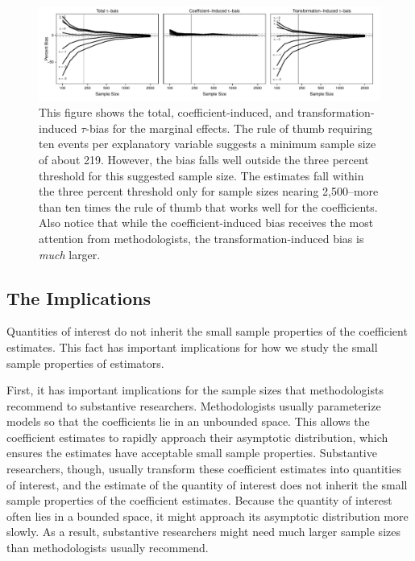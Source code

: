 \documentclass[12pt]{article}
\begin{document}
\begin{figure}[h!]
\begin{center}
\includegraphics[width = \textwidth]{figs/bias-me.pdf}
\caption{This figure shows the total, coefficient-induced, and transformation-induced $\tau$-bias for the marginal effects. The rule of thumb requiring ten events per explanatory variable suggests a minimum sample size of about 219. However, the bias falls well outside the three percent threshold for this suggested sample size. The estimates fall within the three percent threshold only for sample sizes nearing 2,500--more than ten times the rule of thumb that works well for the coefficients. Also notice that while the coefficient-induced bias receives the most attention from methodologists, the transformation-induced bias is \textit{much} larger.}\label{fig:logit-me-bias}
\end{center}
\end{figure}

\subsection*{The Implications}

Quantities of interest do not inherit the small sample properties of the coefficient estimates.
This fact has important implications for how we study the small sample properties of estimators. 

First, it has important implications for the sample sizes that methodologists recommend to substantive researchers. 
Methodologists usually parameterize models so that the coefficients lie in an unbounded space. 
This allows the coefficient estimates to rapidly approach their asymptotic distribution, which ensures the estimates have acceptable small sample properties. 
Substantive researchers, though, usually transform these coefficient estimates into quantities of interest, and the estimate of the quantity of interest does not inherit the small sample properties of the coefficient estimates. 
Because the quantity of interest often lies in a bounded space, it might approach its asymptotic distribution more slowly. 
As a result, substantive researchers might need much larger sample sizes than methodologists usually recommend.
\end{document}
